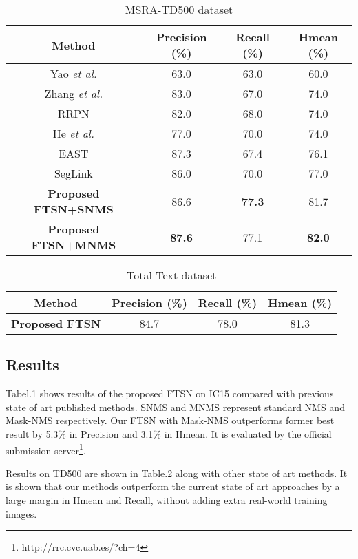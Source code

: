 \documentclass[a4paper,conference]{IEEEtran}
\begin{document}
\begin{table}[htbp]
 \caption{\label{tab:2} MSRA-TD500 dataset}
 \begin{center}
\begin{tabular}
{c||c|c|c}
Method & Precision (\%) & Recall (\%) & Hmean (\%) \\
\hline\hline
 Yao \emph{et al.}\cite{yao2012detecting} & 63.0 & 63.0 & 60.0 \\
 Zhang \emph{et al.}\cite{zhang2016multi_oriented} & 83.0 & 67.0 & 74.0\\
RRPN\cite{Ma2017arbitrary} & 82.0 & 68.0 & 74.0\\
He \emph{et al.}\cite{He2017deep_direct} & 77.0 & 70.0 & 74.0\\
EAST\cite{Zhou2017EAST} & 87.3 & 67.4 & 76.1 \\
SegLink\cite{Shi2017Detecting}  & 86.0 & 70.0 & 77.0 \\
\hline\hline
\textbf{Proposed FTSN+SNMS} & 86.6 & \textbf{77.3} & 81.7 \\
\textbf{Proposed FTSN+MNMS} & \textbf{87.6} & 77.1 & \textbf{82.0} \\
\hline
 \end{tabular}
 \end{center}
\end{table}

\begin{table}[htbp]
 \caption{\label{tab:3} Total-Text dataset}
 \begin{center}
\begin{tabular}
{c||c|c|c}
Method & Precision (\%) & Recall (\%) & Hmean (\%) \\
\hline\hline
\textbf{Proposed FTSN} & 84.7 & 78.0 & 81.3 \\
\hline
 \end{tabular}
 \end{center}
\end{table}
\subsection{Results}
Tabel.1 shows results of the proposed FTSN on IC15 compared with previous state of art published methods. SNMS and MNMS represent standard NMS and Mask-NMS respectively. Our FTSN with Mask-NMS outperforms former best result by 5.3\% in Precision and 3.1\% in Hmean. It is evaluated by the official submission server\footnote{http://rrc.cvc.uab.es/?ch=4}. 

Results on TD500 are shown in Table.2 along with other state of art methods. It is shown that our methods outperform the current state of art approaches by a large margin in Hmean and Recall, without adding extra real-world training images. 
\end{document}
